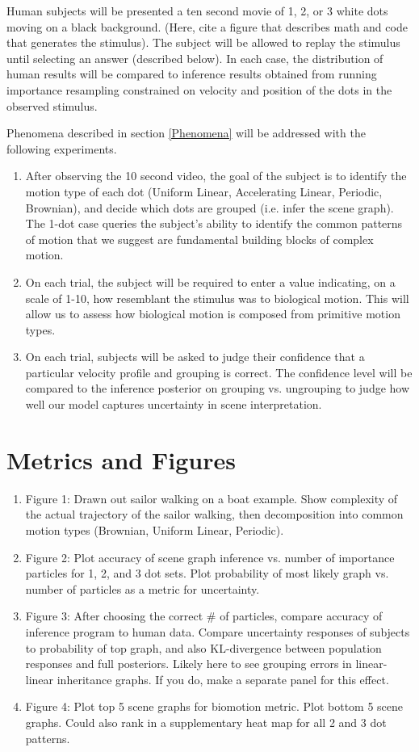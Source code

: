 \documentclass{scrartcl}
\begin{document}
Human subjects will be presented a ten second movie of 1, 2, or 3 white dots moving on a black background. (Here, cite a figure that describes math and code that generates the stimulus). The subject will be allowed to replay the stimulus until selecting an answer (described below). In each case, the distribution of human results will be compared to inference results obtained from running importance resampling constrained on velocity and position of the dots in the observed stimulus. 

Phenomena described in section \ref{Phenomena} will be addressed with the following experiments.

\begin{enumerate}
  \item After observing the 10 second video, the goal of the subject is to identify the motion type of each dot (Uniform Linear, Accelerating Linear, Periodic, Brownian), and decide which dots are grouped (i.e. infer the scene graph). The 1-dot case queries the subject's ability to identify the common patterns of motion that we suggest are fundamental building blocks of complex motion. 
  \item On each trial, the subject will be required to enter a value indicating, on a scale of 1-10, how resemblant the stimulus was to biological motion. This will allow us to assess how biological motion is composed from primitive motion types. 
  \item On each trial, subjects will be asked to judge their confidence that a particular velocity profile and grouping is correct. The confidence level will be compared to the inference posterior on grouping vs. ungrouping to judge how well our model captures uncertainty in scene interpretation.
\end{enumerate}

\section{Metrics and Figures}
\begin{enumerate}
  \item Figure 1: Drawn out sailor walking on a boat example. Show complexity of the actual trajectory of the sailor walking, then decomposition into common motion types (Brownian, Uniform Linear, Periodic).
  \item Figure 2: Plot accuracy of scene graph inference vs. number of importance particles for 1, 2, and 3 dot sets. Plot probability of most likely graph vs. number of particles as a metric for uncertainty.
  \item Figure 3: After choosing the correct \# of particles, compare accuracy of inference program to human data. Compare uncertainty responses of subjects to probability of top graph, and also KL-divergence between population responses and full posteriors. Likely here to see grouping errors in linear-linear inheritance graphs. If you do, make a separate panel for this effect. 
  \item Figure 4: Plot top 5 scene graphs for biomotion metric. Plot bottom 5 scene graphs. Could also rank in a supplementary heat map for all 2 and 3 dot patterns. 
\end{enumerate}
  
\end{document}
